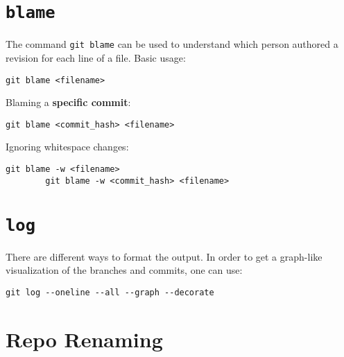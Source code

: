 \documentclass[12pt, a4paper]{scrbook}
\numberwithin{equation}{section}
\theoremstyle{definition}
\theoremstyle{definition}
\begin{document}
	\section{\texttt{blame}}
	
	The command \texttt{git blame} can be used to understand which person authored a revision for each line of a file. Basic usage:
	
	\begin{lstlisting}[style=mystylebash, label=alg:git_blame_a, xleftmargin=\parindent]
		git blame <filename>
	\end{lstlisting}

	Blaming a \textbf{specific commit}:
	
	\begin{lstlisting}[style=mystylebash, label=alg:git_blame_b, xleftmargin=\parindent]
		git blame <commit_hash> <filename>
	\end{lstlisting}
		
	Ignoring whitespace changes:
	
	\begin{lstlisting}[style=mystylebash, label=alg:git_blame_c, xleftmargin=\parindent]
		git blame -w <filename>
		git blame -w <commit_hash> <filename>
	\end{lstlisting}
	
	\section{\texttt{log}}
	
	There are different ways to format the output. In order to get a graph-like visualization of the branches and commits, one can use:
	
	\begin{lstlisting}[style=mystylebash, label=alg:git_log, xleftmargin=\parindent]
		git log --oneline --all --graph --decorate
	\end{lstlisting}
	
	\section{Repo Renaming}
		
\end{document}
